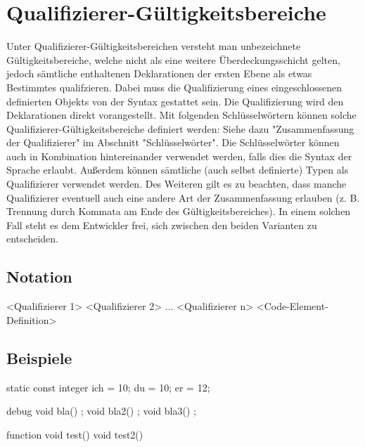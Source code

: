 \chapter{Qualifizierer-Gültigkeitsbereiche}
Unter Qualifizierer-Gültigkeitsbereichen versteht man unbezeichnete Gültigkeitsbereiche,
welche nicht als eine weitere Überdeckungsschicht gelten, jedoch sämtliche enthaltenen Deklarationen der ersten Ebene
als etwas Bestimmtes qualifzieren.
Dabei muss die Qualifizierung eines eingeschlossenen definierten Objekts von der Syntax gestattet sein.
Die Qualifizierung wird den Deklarationen direkt vorangestellt.
Mit folgenden Schlüsselwörtern können solche Qualifizierer-Gültigkeitsbereiche definiert werden:
Siehe dazu "Zusammenfassung der Qualifizierer" im Abschnitt "Schlüsselwörter".
Die Schlüsselwörter können auch in Kombination hintereinander verwendet werden, falls dies die Syntax der Sprache
erlaubt.
Außerdem können sämtliche (auch selbst definierte) Typen als Qualifizierer verwendet werden.
Des Weiteren gilt es zu beachten, dass manche Qualifizierer eventuell auch eine andere Art der Zusammenfassung erlauben
(z. B. Trennung durch Kommata am Ende des Gültigkeitsbereiches).
In einem solchen Fall steht es dem Entwickler frei, sich zwischen den beiden Varianten zu entscheiden.

\section{Notation}
<Qualifizierer 1> <Qualifizierer 2> ... <Qualifizierer n>
{
	<Code-Element-Definition>
}

\section{Beispiele}
static const integer
{
	ich = 10;
	du = 10;
	er = 12;
}

debug
{
	void bla() {};
	void bla2() {};
	void bla3() {};
}

function
{
	void test() { }
	void test2() { }
}